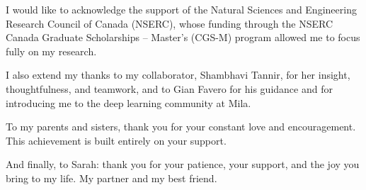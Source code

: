 \documentclass[12pt]{report}
\begin{document}
I would like to acknowledge the support of the Natural Sciences and Engineering Research Council of Canada (NSERC), whose funding through the NSERC Canada Graduate Scholarships – Master’s (CGS-M) program allowed me to focus fully on my research.

I also extend my thanks to my collaborator, Shambhavi Tannir, for her insight, thoughtfulness, and teamwork, and to Gian Favero for his guidance and for introducing me to the deep learning community at Mila.

To my parents and sisters, thank you for your constant love and encouragement. This achievement is built entirely on your support.

And finally, to Sarah: thank you for your patience, your support, and the joy you bring to my life. My partner and my best friend.


\tableofcontents
\listoffigures

\listoftables


\clearpage




\clearpage

\setcounter{page}{1}






% 




\end{document}
